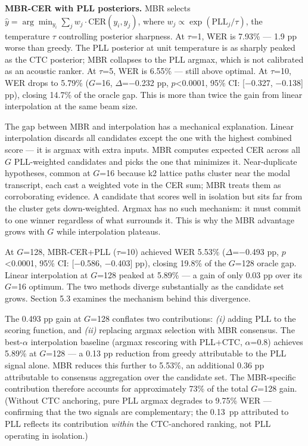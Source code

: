 \textbf{MBR-CER with PLL posteriors.} MBR selects
$\hat{y} = \arg\min_{y_i} \sum_j w_j \cdot \text{CER}(y_i, y_j)$, where
$w_j \propto \exp(\text{PLL}_j / \tau)$, the temperature $\tau$ controlling posterior sharpness. At
$\tau$=1, WER is 7.93\% — 1.9 pp worse than greedy. The PLL posterior at unit temperature is as
sharply peaked as the CTC posterior; MBR collapses to the PLL argmax, which is not calibrated as an
acoustic ranker. At $\tau$=5, WER is 6.55\% — still above optimal. At $\tau$=10, WER drops to
5.79\% ($G$=16, $\Delta$=$-$0.232 pp, $p$<0.0001, 95\% CI: [$-$0.327, $-$0.138] pp), closing 14.7\% of
the oracle gap. This is more than twice the gain from linear interpolation at the same beam size.

The gap between MBR and interpolation has a mechanical explanation. Linear interpolation discards
all candidates except the one with the highest combined score — it is argmax with extra inputs. MBR
computes expected CER across all $G$ PLL-weighted candidates and picks the one that minimizes it.
Near-duplicate hypotheses, common at $G$=16 because k2 lattice paths cluster near the modal
transcript, each cast a weighted vote in the CER sum; MBR treats them as corroborating evidence.
A candidate that scores well in isolation but sits far from the cluster gets down-weighted.
Argmax has no such mechanism: it must commit to one winner regardless of what surrounds it.
This is why the MBR advantage grows with $G$ while interpolation plateaus.

At $G$=128, MBR-CER+PLL ($\tau$=10) achieved WER 5.53\% ($\Delta$=$-$0.493 pp, $p$<0.0001, 95\% CI:
[$-$0.586, $-$0.403] pp), closing 19.8\% of the $G$=128 oracle gap. Linear interpolation at $G$=128
peaked at 5.89\% — a gain of only 0.03 pp over its $G$=16 optimum. The two methods diverge
substantially as the candidate set grows. Section 5.3 examines the mechanism behind this divergence.

The 0.493 pp gain at $G$=128 conflates two contributions: \emph{(i)} adding PLL to the scoring
function, and \emph{(ii)} replacing argmax selection with MBR consensus. The best-$\alpha$
interpolation baseline (argmax rescoring with PLL+CTC, $\alpha$=0.8) achieves 5.89\% at $G$=128 —
a 0.13 pp reduction from greedy attributable to the PLL signal alone. MBR reduces this further to
5.53\%, an additional 0.36 pp attributable to consensus aggregation over the candidate set. The
MBR-specific contribution therefore accounts for approximately 73\% of the total $G$=128 gain. (Without CTC anchoring, pure PLL argmax degrades to 9.75\% WER — confirming that the two signals are complementary; the 0.13~pp attributed to PLL reflects its contribution \emph{within} the CTC-anchored ranking, not PLL operating in isolation.)

